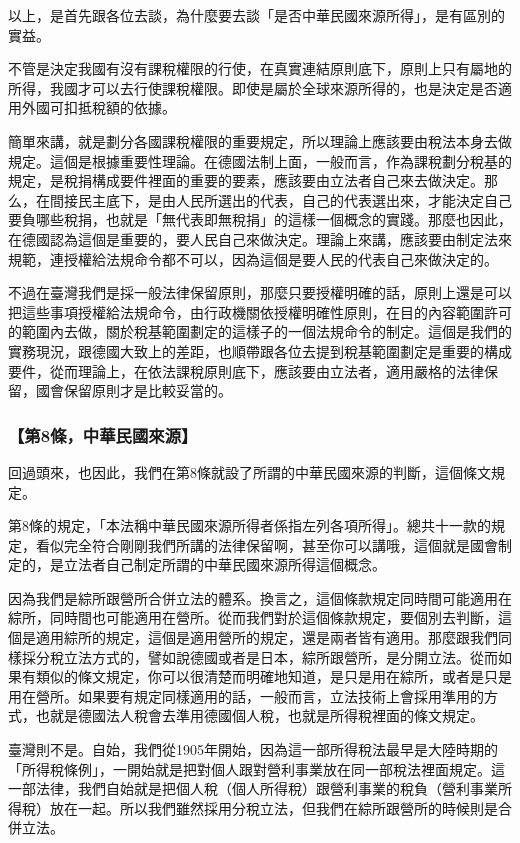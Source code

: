 \documentclass[oneside,sub3section]{ctexbook}
\begin{document}
以上，是首先跟各位去談，為什麼要去談「是否中華民國來源所得」，是有區別的實益。

不管是決定我國有沒有課稅權限的行使，在真實連結原則底下，原則上只有屬地的所得，我國才可以去行使課稅權限。即使是屬於全球來源所得的，也是決定是否適用外國可扣抵稅額的依據。

簡單來講，就是劃分各國課稅權限的重要規定，所以理論上應該要由稅法本身去做規定。這個是根據重要性理論。在德國法制上面，一般而言，作為課稅劃分稅基的規定，是稅捐構成要件裡面的重要的要素，應該要由立法者自己來去做決定。那么，在間接民主底下，是由人民所選出的代表，自己的代表選出來，才能決定自己要負哪些稅捐，也就是「無代表即無稅捐」的這樣一個概念的實踐。那麼也因此，在德國認為這個是重要的，要人民自己來做決定。理論上來講，應該要由制定法來規範，連授權給法規命令都不可以，因為這個是要人民的代表自己來做決定的。

不過在臺灣我們是採一般法律保留原則，那麼只要授權明確的話，原則上還是可以把這些事項授權給法規命令，由行政機關依授權明確性原則，在目的內容範圍許可的範圍內去做，關於稅基範圍劃定的這樣子的一個法規命令的制定。這個是我們的實務現況，跟德國大致上的差距，也順帶跟各位去提到稅基範圍劃定是重要的構成要件，從而理論上，在依法課稅原則底下，應該要由立法者，適用嚴格的法律保留，國會保留原則才是比較妥當的。

\hypertarget{ux7b2c8ux689dux4e2dux83efux6c11ux570bux4f86ux6e90}{%
\subsubsection{【第8條，中華民國來源】}\label{ux7b2c8ux689dux4e2dux83efux6c11ux570bux4f86ux6e90}}

回過頭來，也因此，我們在第8條就設了所謂的中華民國來源的判斷，這個條文規定。

第8條的規定，「本法稱中華民國來源所得者係指左列各項所得」。總共十一款的規定，看似完全符合剛剛我們所講的法律保留啊，甚至你可以講哦，這個就是國會制定的，是立法者自己制定所謂的中華民國來源所得這個概念。

因為我們是綜所跟營所合併立法的體系。換言之，這個條款規定同時間可能適用在綜所，同時間也可能適用在營所。從而我們對於這個條款規定，要個別去判斷，這個是適用綜所的規定，這個是適用營所的規定，還是兩者皆有適用。那麼跟我們同樣採分稅立法方式的，譬如說德國或者是日本，綜所跟營所，是分開立法。從而如果有類似的條文規定，你可以很清楚而明確地知道，是只是用在綜所，或者是只是用在營所。如果要有規定同樣適用的話，一般而言，立法技術上會採用準用的方式，也就是德國法人稅會去準用德國個人稅，也就是所得稅裡面的條文規定。

臺灣則不是。自始，我們從1905年開始，因為這一部所得稅法最早是大陸時期的「所得稅條例」，一開始就是把對個人跟對營利事業放在同一部稅法裡面規定。這一部法律，我們自始就是把個人稅（個人所得稅）跟營利事業的稅負（營利事業所得稅）放在一起。所以我們雖然採用分稅立法，但我們在綜所跟營所的時候則是合併立法。
\end{document}
